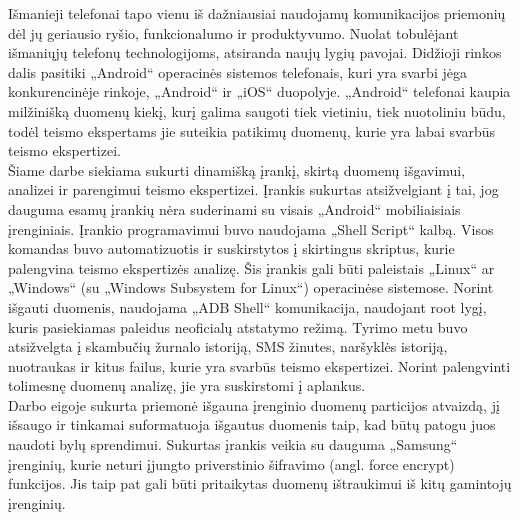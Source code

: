 Išmanieji telefonai tapo vienu iš dažniausiai naudojamų komunikacijos priemonių dėl jų geriausio ryšio, funkcionalumo ir produktyvumo. Nuolat tobulėjant išmaniųjų telefonų technologijoms, atsiranda naujų lygių pavojai. Didžioji rinkos dalis pasitiki „Android“ operacinės sistemos telefonais, kuri yra svarbi jėga konkurencinėje rinkoje, „Android“ ir „iOS“ duopolyje. „Android“ telefonai kaupia milžinišką duomenų kiekį, kurį galima saugoti tiek vietiniu, tiek nuotoliniu būdu, todėl teismo ekspertams jie suteikia patikimų duomenų, kurie yra labai svarbūs teismo ekspertizei. \\

Šiame darbe siekiama sukurti dinamišką įrankį, skirtą duomenų išgavimui, analizei ir parengimui teismo ekspertizei. Įrankis sukurtas atsižvelgiant į tai, jog dauguma esamų įrankių nėra suderinami su visais „Android“ mobiliaisiais įrenginiais. Įrankio programavimui buvo naudojama „Shell Script“ kalbą. Visos komandas buvo automatizuotis ir suskirstytos į skirtingus skriptus, kurie palengvina teismo ekspertizės analizę. Šis įrankis gali būti  paleistais „Linux“ ar „Windows“ (su „Windows Subsystem for Linux“) operacinėse sistemose. Norint išgauti duomenis, naudojama „ADB Shell“ komunikacija, naudojant root lygį, kuris pasiekiamas paleidus neoficialų atstatymo režimą. Tyrimo metu buvo atsižvelgta į skambučių žurnalo istoriją, SMS žinutes, naršyklės istoriją, nuotraukas ir kitus failus, kurie yra svarbūs teismo ekspertizei. Norint palengvinti tolimesnę duomenų analizę, jie yra suskirstomi į aplankus. \\

Darbo eigoje sukurta priemonė išgauna įrenginio duomenų particijos atvaizdą, jį išsaugo ir tinkamai suformatuoja išgautus duomenis taip, kad būtų patogu juos naudoti bylų sprendimui. Sukurtas įrankis veikia su dauguma „Samsung“ įrenginių, kurie neturi įjungto priverstinio šifravimo (angl. force encrypt) funkcijos. Jis taip pat gali būti pritaikytas duomenų ištraukimui iš kitų gamintojų įrenginių.